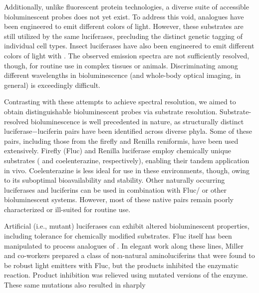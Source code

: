Additionally, unlike fluorescent protein technologies, a diverse
suite of accessible bioluminescent probes does not yet exist. To
address this void, \dluciferin{} analogues have been engineered to
emit different colors of light.\cite{RN14,Jathoul:2014do,RN165} However, these substrates are
still utilized by the same luciferases, precluding the distinct
genetic tagging of individual cell types. Insect luciferases have
also been engineered to emit different colors of light with \dluciferin{}.\cite{Branchini:2007fza,Branchini:2007bw,Mezzanotte:2010fq}
The observed emission spectra are not sufficiently
resolved, though, for routine use in complex tissues or animals.
Discriminating among different wavelengths in bioluminescence
(and whole-body optical imaging, in general) is
exceedingly difficult.
\par
Contrasting with these attempts to achieve spectral
resolution, we aimed to obtain distinguishable bioluminescent
probes via substrate resolution. Substrate-resolved bioluminescence
is well precedented in nature, as structurally distinct
luciferase−luciferin pairs have been identified across diverse
phyla.\cite{Haddock:2010cx, Oba:2014cc, RN45} Some of these pairs, including those from the firefly
and Renilla reniformis, have been used extensively.\cite{RN26, Badr:2011if, Porterfield:2015bu, Massoud:2007en} Firefly
(Fluc) and Renilla luciferase employ chemically unique
substrates (\dluciferin{} and coelenterazine, respectively), enabling
their tandem application in vivo.\cite{Bhaumik:2002hf, Maguire:2013kb} Coelenterazine is
less ideal for use in these environments, though, owing to its
suboptimal bioavailability and stability.\cite{RN26, Pichler:2004ke} Other naturally
occurring luciferases and luciferins can be used in combination
with Fluc/\dluciferin{} or other bioluminescent systems.\cite{Maguire:2013kb, Petushkov:2014ha}
However, most of these native pairs remain poorly characterized
or ill-suited for routine use.
\par
Artificial (i.e., mutant) luciferases can exhibit altered
bioluminescent properties, including tolerance for chemically
modified substrates. Fluc itself has been manipulated to process
analogues of \dluciferin{}.\cite{RN98} In elegant work along these lines,
Miller and co-workers prepared a class of non-natural
aminoluciferins that were found to be robust light emitters
with Fluc, but the products inhibited the enzymatic reaction.\cite{Reddy:2010gaa}
Product inhibition was relieved using mutated versions of the
enzyme.\cite{Harwood:2011gl} These same mutations also resulted in sharply
